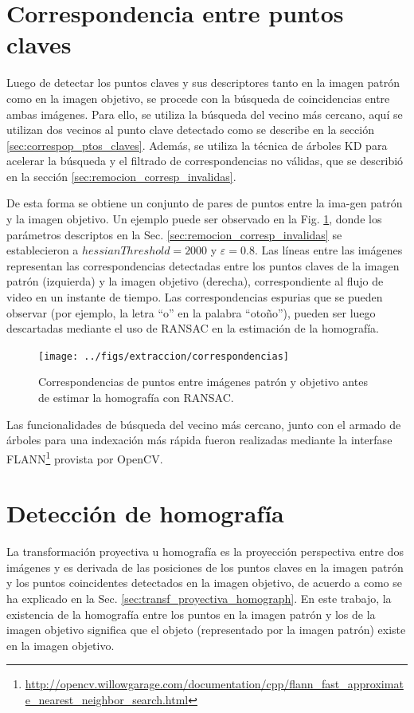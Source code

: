 \section{Correspondencia entre puntos claves}
Luego de detectar los puntos claves y sus descriptores tanto en la imagen patrón como en la imagen objetivo, se procede con la búsqueda de coincidencias entre ambas imágenes. Para ello, se utiliza la búsqueda del vecino más cercano, aquí se utilizan dos vecinos al punto clave detectado como se describe en la sección \ref{sec:correspop_ptos_claves}. Además, se utiliza la técnica de árboles KD para acelerar la búsqueda y el filtrado de correspondencias no válidas, que se describió en la sección \ref{sec:remocion_corresp_invalidas}.

De esta forma se obtiene un conjunto de pares de puntos entre la ima-gen patrón y la imagen objetivo. Un ejemplo puede ser observado en la Fig. \ref{fig:correspondencias_deteccion_lineas}, donde los parámetros descriptos en la Sec. \ref{sec:remocion_corresp_invalidas} se establecieron a $\mathit{hessianThreshold}=2000$ y $\varepsilon=0.8$. Las líneas entre las imágenes representan las correspondencias detectadas entre los puntos claves de la imagen patrón (izquierda) y la imagen objetivo (derecha), correspondiente al flujo de video en un instante de tiempo. Las correspondencias espurias que se pueden observar (por ejemplo, la letra ``o'' en la palabra ``otoño''), pueden ser luego descartadas mediante el uso de RANSAC en la estimación de la homografía.
\begin{figure}[tbhp]
   \centering
        \texttt{[image: ../figs/extraccion/correspondencias]}
    \caption[Correspondencias de puntos entre imágenes patrón y objetivo]{Correspondencias de puntos entre imágenes patrón y objetivo antes de estimar la homografía con RANSAC.}
   \label{fig:correspondencias_deteccion_lineas}                %
\end{figure}

Las funcionalidades de búsqueda del vecino más cercano, junto con el armado de árboles para una indexación más rápida fueron realizadas mediante la interfase FLANN\footnote{\url{http://opencv.willowgarage.com/documentation/cpp/flann_fast_approximate_nearest_neighbor_search.html}} provista por OpenCV. %
\section{Detección de homografía}
\label{sec:detec_homografia}
La transformación proyectiva u homografía es la proyección perspectiva entre dos imágenes y es derivada de las posiciones de los puntos claves en la imagen patrón y los puntos coincidentes detectados en la imagen objetivo, de acuerdo a como se ha explicado en la Sec. \ref{sec:transf_proyectiva_homograph}. En este trabajo, la existencia de la homografía entre los puntos en la imagen patrón y los de la imagen objetivo significa que el objeto (representado por la imagen patrón) existe en la imagen objetivo.

